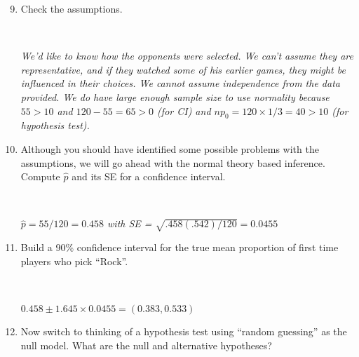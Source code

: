 \begin{enumerate}
 \setcounter{enumi}{8}
 \item  Check the assumptions.
\begin{students}
\\   \vspace{2cm}    
\end{students}

\begin{key} 
 {\it %
   We'd like to know how the
  opponents were selected. We can't assume they are representative,
  and if they watched some of his earlier games, they might be
  influenced in their 
  choices. We cannot assume independence from the data provided. We do
have large enough sample size to use normality because $55 > 10$ and
$120-55 = 65>0$ (for CI) and $np_0 = 120\times 1/3 = 40>10$ (for
hypothesis test).}
\end{key}
\item Although you should have identified some possible problems with
  the assumptions, we will go ahead with the normal theory based
  inference. Compute $\widehat{p}$ and its SE for a confidence
  interval.
\begin{students}
    \vspace{1cm}    \\
\end{students}

\begin{key} 
{\it $\widehat{p} = 55/120 = 0.458$ with SE = $\sqrt{.458(.542)/120} =
  0.0455$}
\end{key}
\item Build a 90\% confidence interval for the true mean proportion of
  first time players who pick ``Rock''.
\begin{students}
    \vspace{1cm}    \\
\end{students}

\begin{key} 
{\it $0.458 \pm 1.645 \times 0.0455 = (0.383, 0.533)$}
\end{key}
\item Now switch to thinking of a hypothesis test using ``random
  guessing'' as the null model.  What are the null and alternative
  hypotheses? 
\begin{students}
    \vspace{2cm}    \\
\end{students}


\end{enumerate}
